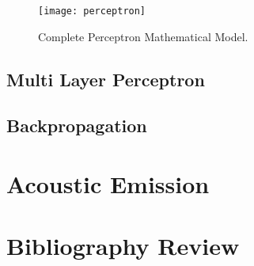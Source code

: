 \begin{figure}[H]
	\centering
	\texttt{[image: perceptron]}
	\caption{Complete Perceptron Mathematical Model.}
	\label{fig:perceptron}
\end{figure}



\subsection{Multi Layer Perceptron}\label{sec:MLP}

\subsection{Backpropagation}\label{sec:backpropagation}

\section{Acoustic Emission}\label{sec:acousticEmission}

\section{Bibliography Review} \label{sec:bibliographyReview}